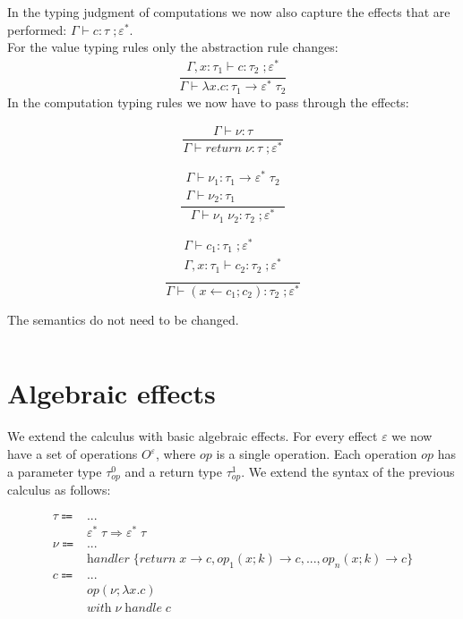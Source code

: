 \documentclass[12pt]{article}
\newcommand\eff[0]{\varepsilon}
\newcommand\effs[0]{\eff^*}
\newcommand\eop[0]{\textit{op}}
\newcommand\eops[1]{O^{#1}}
\newcommand\type[0]{\tau}
\newcommand\tarre[3]{#1 \rightarrow #2 \; #3}
\newcommand\thandler[4]{#1 \; #2 \Rightarrow #3 \; #4}
\newcommand\val[0]{\nu}
\newcommand\vabs[2]{\lambda #1 . #2}
\newcommand\vhandler[1]{\textit{handler} \; \{#1\}}
\newcommand\vhandlerc[0]{\vhandler{
	\textit{return} \; x \rightarrow \comp,
	\eop_1(x ; k) \rightarrow \comp,
	...,
	\eop_n(x ; k) \rightarrow \comp
}}
\newcommand\comp[0]{c}
\newcommand\creturn[1]{\textit{return} \; #1}
\newcommand\capp[2]{#1 \; #2}
\newcommand\cop[4]{#1(#2 ; \lambda #3 . #4)}
\newcommand\cdo[3]{#1 \leftarrow #2 ; #3}
\newcommand\chandle[2]{\textit{with} \; #1 \; \textit{handle} \; #2}
\begin{document}
In the typing judgment of computations we now also capture the effects that are performed: $\Gamma \vdash \comp : \type \; ; \effs$. \\
For the value typing rules only the abstraction rule changes:
\[\frac{
	\begin{array}{l}
	\Gamma, x : \type_1 \vdash \comp : \type_2 \; ; \effs
	\end{array}
}{
	\Gamma \vdash \vabs{x}{\comp} : \tarre{\type_1}{\effs}{\type_2}
}\]
In the computation typing rules we now have to pass through the effects:
\begin{minipage}{0.33\textwidth}
\[\frac{
	\begin{array}{l}
	\Gamma \vdash \val : \type
	\end{array}
}{
	\Gamma \vdash \creturn{\val} : \type \; ; \effs
}\]
\end{minipage}
\begin{minipage}{0.33\textwidth}
\[\frac{
	\begin{array}{l}
	\Gamma \vdash \val_1 : \tarre{\type_1}{\effs}{\type_2} \\
	\Gamma \vdash \val_2 : \type_1
	\end{array}
}{
	\Gamma \vdash \capp{\val_1}{\val_2} : \type_2 \; ; \effs
}\]
\end{minipage}
\begin{minipage}{0.33\textwidth}
\[\frac{
	\begin{array}{l}
	\Gamma \vdash \comp_1 : \type_1 \; ; \effs \\
	\Gamma , x : \type_1 \vdash \comp_2 : \type_2 \; ; \effs \\
	\end{array}
}{
	\Gamma \vdash (\cdo{x}{\comp_1}{\comp_2}) : \type_2 \; ; \effs
}\]
\end{minipage}

The semantics do not need to be changed.
\newpage
\inputminted{haskell}{code2.txt}

\newpage
\section{Algebraic effects}

We extend the calculus with basic algebraic effects. For every effect $\eff$ we now have a set of operations $\eops{\eff}$, where $\eop$ is a single operation. Each operation $\eop$ has a parameter type $\type^0_\eop$ and a return type $\type^1_\eop$. We extend the syntax of the previous calculus as follows:

\begin{align*}
	\type \Coloneqq 	& ...							\tag{types} \\
				& \thandler{\effs}{\type}{\effs}{\type}	\tag{type of handlers} \\
	\val \Coloneqq	& ...							\tag{values} \\
				& \vhandlerc						\tag{handler} \\
	\comp \Coloneqq	& ...							\tag{computations} \\
				& \cop{\eop}{\val}{x}{\comp}			\tag{operation call} \\
				& \chandle{\val}{\comp}				\tag{handle computation} \\
\end{align*}
\end{document}
